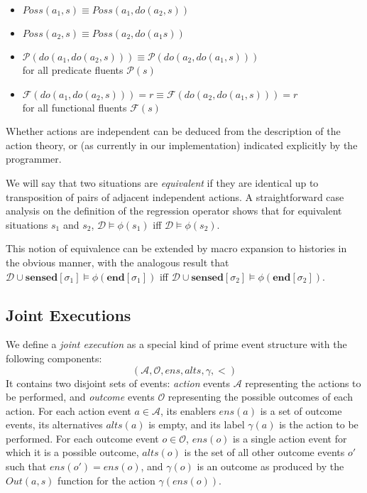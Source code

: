 \begin{itemize}
\item $Poss(a_{1},s)\equiv Poss(a_{1},do(a_{2},s))$ 
\item $Poss(a_{2},s)\equiv Poss(a_{2},do(a_{1}s))$ 
\item $\mathcal{P}(do(a_{1},do(a_{2},s)))\equiv\mathcal{P}(do(a_{2},do(a_{1},s)))$\\
 for all predicate fluents $\mathcal{P}(s)$ 
\item $\mathcal{F}(do(a_{1},do(a_{2},s)))=r\equiv\mathcal{F}(do(a_{2},do(a_{1},s)))=r$\\
 for all functional fluents $\mathcal{F}(s)$ 
\end{itemize}
Whether actions are independent can be deduced from the description
of the action theory, or (as currently in our implementation) indicated
explicitly by the programmer.

We will say that two situations are \emph{equivalent} if they are
identical up to transposition of pairs of adjacent independent actions.
A straightforward case analysis on the definition of the regression
operator shows that for equivalent situations $s_{1}$ and $s_{2}$,
$\mathcal{D}\models\phi(s_{1})$ iff $\mathcal{D}\models\phi(s_{2})$.

This notion of equivalence can be extended by macro expansion to histories
in the obvious manner, with the analogous result that $\mathcal{D}\cup\mathbf{sensed}[\sigma_{1}]\models\phi(\mathbf{end}[\sigma_{1}])$
iff $\mathcal{D}\cup\mathbf{sensed}[\sigma_{2}]\models\phi(\mathbf{end}[\sigma_{2}])$.


\subsection{Joint Executions}

We define a \emph{joint execution} as a special kind of prime event
structure with the following components:\[
(\mathcal{A},\mathcal{O},ens,alts,\gamma,<)\]
 It contains two disjoint sets of events: \emph{action} events $\mathcal{A}$
representing the actions to be performed, and \emph{outcome} events
$\mathcal{O}$ representing the possible outcomes of each action.
For each action event $a\in\mathcal{A}$, its enablers $ens(a)$ is
a set of outcome events, its alternatives $alts(a)$ is empty, and
its label $\gamma(a)$ is the action to be performed. For each outcome
event $o\in\mathcal{O}$, $ens(o)$ is a single action event for which
it is a possible outcome, $alts(o)$ is the set of all other outcome
events $o'$ such that $ens(o')=ens(o)$, and $\gamma(o)$ is an outcome
as produced by the $Out(a,s)$ function for the action $\gamma(ens(o))$.

